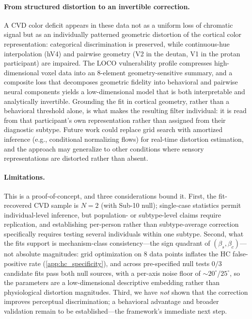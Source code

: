 \documentclass{article}
\begin{document}
\paragraph{From structured distortion to an invertible correction.}
A CVD color deficit appears in these data not as a uniform loss of chromatic signal but as an individually patterned geometric distortion of the cortical color representation: categorical discrimination is preserved, while continuous-hue interpolation (hV4) and pairwise geometry (V2 in the deutan, V1 in the protan participant) are impaired.
The LOCO vulnerability profile compresses high-dimensional voxel data into an 8-element geometry-sensitive summary, and a composite loss that decomposes geometric fidelity into behavioral and pairwise neural components yields a low-dimensional model that is both interpretable and analytically invertible.
Grounding the fit in cortical geometry, rather than a behavioral threshold alone, is what makes the resulting filter individual: it is read from that participant's own representation rather than assigned from their diagnostic subtype.
Future work could replace grid search with amortized inference (e.g., conditional normalizing flows) for real-time distortion estimation, and the approach may generalize to other conditions where sensory representations are distorted rather than absent.

\paragraph{Limitations.}
This is a proof-of-concept, and three considerations bound it.
First, the fit-recovered CVD sample is $N = 2$ (with Sub-10 null); single-case statistics \citep{crawford1998} permit individual-level inference, but population- or subtype-level claims require replication, and establishing per-person rather than subtype-average correction specifically requires testing several individuals within one subtype.
Second, what the fits support is mechanism-class consistency---the sign quadrant of $(\beta_s, \beta_c)$---not absolute magnitudes: grid optimization on 8 data points inflates the HC false-positive rate (\cref{app:hc_specificity}), and across pre-specified null tests $0/3$ candidate fits pass both null sources, with a per-axis noise floor of ${\sim}20^\circ$/$25^\circ$, so the parameters are a low-dimensional descriptive embedding rather than physiological distortion magnitudes.
Third, we have \emph{not} shown that the correction improves perceptual discrimination; a behavioral advantage and broader validation remain to be established---the framework's immediate next step.
\end{document}

